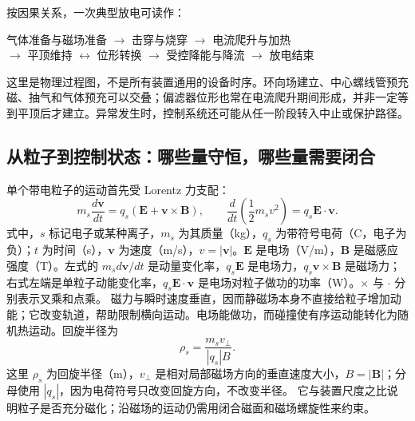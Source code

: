 \documentclass[12pt,fontset=none]{ctexart}
\numberwithin{equation}{section}
\numberwithin{table}{section}
\numberwithin{figure}{section}
\begin{document}
按因果关系，一次典型放电可读作：
\begin{center}
\small
气体准备与磁场准备 $\longrightarrow$ 击穿与烧穿 $\longrightarrow$ 电流爬升与加热\\[3pt]
$\longrightarrow$ 平顶维持 $\longleftrightarrow$ 位形转换 $\longrightarrow$ 受控降能与降流 $\longrightarrow$ 放电结束
\end{center}
这里是物理过程图，不是所有装置通用的设备时序。环向场建立、中心螺线管预充磁、抽气和气体预充可以交叠；偏滤器位形也常在电流爬升期间形成，并非一定等到平顶后才建立。异常发生时，控制系统还可能从任一阶段转入中止或保护路径。

\subsection{从粒子到控制状态：哪些量守恒，哪些量需要闭合}\label{sec:cycle-principles}

单个带电粒子的运动首先受 Lorentz 力支配：
\begin{equation}\label{eq:cycle-lorentz}
 m_s\frac{d\bm v}{dt}=q_s(\bm E+\bm v\times\bm B),
 \qquad \frac{d}{dt}\left(\frac12m_sv^2\right)=q_s\bm E\cdot\bm v.
\end{equation}
式中，$s$ 标记电子或某种离子，$m_s$ 为其质量（kg），$q_s$ 为带符号电荷（C，电子为负）；$t$ 为时间（s），$\bm v$ 为速度（m/s），$v=|\bm v|$。$\bm E$ 是电场（V/m），$\bm B$ 是磁感应强度（T）。左式的 $m_s d\bm v/dt$ 是动量变化率，$q_s\bm E$ 是电场力，$q_s\bm v\times\bm B$ 是磁场力；右式左端是单粒子动能变化率，$q_s\bm E\cdot\bm v$ 是电场对粒子做功的功率（W）。$\times$ 与 $\cdot$ 分别表示叉乘和点乘。
磁力与瞬时速度垂直，因而静磁场本身不直接给粒子增加动能；它改变轨道，帮助限制横向运动。电场能做功，而碰撞使有序运动能转化为随机热运动。回旋半径为
\begin{equation}\label{eq:cycle-gyroradius}
 \rho_s=\frac{m_sv_\perp}{|q_s|B}.
\end{equation}
这里 $\rho_s$ 为回旋半径（m），$v_\perp$ 是相对局部磁场方向的垂直速度大小，$B=|\bm B|$；分母使用 $|q_s|$，因为电荷符号只改变回旋方向，不改变半径。
它与装置尺度之比说明粒子是否充分磁化；沿磁场的运动仍需用闭合磁面和磁场螺旋性来约束。
\end{document}
